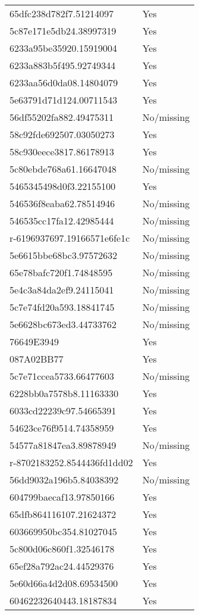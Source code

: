 \begin{tabular}{ll}
65dfc238d782f7.51214097 & Yes \\
5c87e171e5db24.38997319 & Yes \\
6233a95be35920.15919004 & Yes \\
6233a883b5f495.92749344 & Yes \\
6233aa56d0da08.14804079 & Yes \\
5e63791d71d124.00711543 & Yes \\
56df55202fa882.49475311 & No/missing \\
58c92fde692507.03050273 & Yes \\
58c930eece3817.86178913 & Yes \\
5c80ebde768a61.16647048 & No/missing \\
5465345498d0f3.22155100 & Yes \\
546536f8eaba62.78514946 & No/missing \\
546535cc17fa12.42985444 & No/missing \\
r-6196937697.19166571e6fe1c & No/missing \\
5e6615bbe68bc3.97572632 & No/missing \\
65e78bafc720f1.74848595 & No/missing \\
5e4c3a84da2ef9.24115041 & No/missing \\
5c7e74fd20a593.18841745 & No/missing \\
5e6628bc673ed3.44733762 & No/missing \\
76649E3949 & Yes \\
087A02BB77 & Yes \\
5c7e71ccea5733.66477603 & No/missing \\
6228bb0a7578b8.11163330 & Yes \\
6033cd22239c97.54665391 & Yes \\
54623ce76f9514.74358959 & Yes \\
54577a81847ea3.89878949 & No/missing \\
r-8702183252.8544436fd1dd02 & Yes \\
56dd9032a196b5.84038392 & No/missing \\
604799baecaf13.97850166 & Yes \\
65dfb864116107.21624372 & Yes \\
603669950bc354.81027045 & Yes \\
5c800d06c860f1.32546178 & Yes \\
65ef28a792ac24.44529376 & Yes \\
5e60d66a4d2d08.69534500 & Yes \\
60462232640443.18187834 & Yes \\

\end{tabular}

